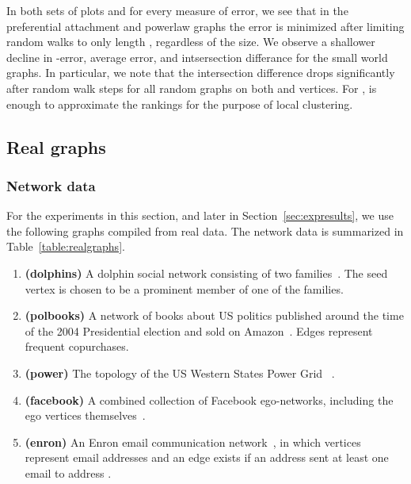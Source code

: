 \documentclass[runningheads,a4paper]{llncs}
\begin{document}
In both sets of plots and for every measure of error, we see that in the
preferential attachment and powerlaw graphs the error is minimized after
limiting random walks to only length , regardless of the size.  We observe
a shallower decline in -error, average  error, and intsersection
differance for the small world graphs.  In particular, we note that the
intersection difference drops significantly after  random walk steps for all
random graphs on both  and  vertices.  For ,  is enough to approximate the rankings for the
purpose of local clustering.


\subsection{Real graphs}
\label{sec:realranking}

\subsubsection{Network data}
For the experiments in this section, and later in Section~\ref{sec:expresults},
we use the following graphs compiled from real data.  The network data is
summarized in Table~\ref{table:realgraphs}.

\begin{enumerate}
\item \textbf{(dolphins)} A dolphin social network consisting of two
families~\cite{dolphins}.  The seed vertex is chosen to be a prominent member of
one of the families.\label{pt:dolphins}
\item \textbf{(polbooks)} A network of books about US politics published around
the time of the 2004 Presidential election and sold on Amazon~\cite{polbooks}.
Edges represent frequent copurchases.\label{pt:polbooks}
\item \textbf{(power)} The topology of the US Western States Power Grid
~\cite{powergrid}.\label{pt:powergrid}
\item \textbf{(facebook)} A combined collection of Facebook ego-networks,
including the ego vertices themselves~\cite{facebook}.\label{pt:facebook}
\item \textbf{(enron)} An Enron email communication network~\cite{enron},
in which vertices represent email addresses and an edge  exists if an
address  sent at least one email to address .\label{pt:enron}
\end{enumerate}
\end{document}
